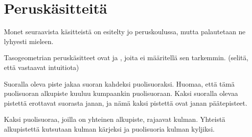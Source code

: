 \section*{Peruskäsitteitä}

Monet seuraavista käsitteistä on esitelty jo peruskoulussa, mutta palautetaan ne lyhyesti
mieleen.

Tasogeometrian peruskäsitteet ovat  ja , joita ei
määritellä sen tarkemmin. (selitä, että vastaavat intuitiota)

Suoralla oleva piste jakaa suoran kahdeksi puolisuoraksi. Huomaa, että tämä puolisuoran
alkupiste kuuluu kumpaankin puolisuoraan. Kaksi suoralla olevaa pistettä erottavat suorasta
janan, ja nämä kaksi pistettä ovat janan päätepisteet.

Kaksi puolisuoraa, joilla on yhteinen alkupiste, rajaavat kulman. Yhteistä alkupistettä
kutsutaan kulman kärjeksi ja puolisuoria kulman kyljiksi. 